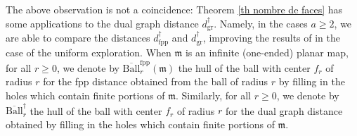 \documentclass[11pt]{article}
\numberwithin{equation}{section}
\begin{document}
{The above observation is not a coincidence:} Theorem \ref{th nombre de faces} has some applications to the dual graph distance $d^\dagger_{\mathrm{gr}}$. Namely, in the cases $a \ge 2$, {we are able to} compare the distances $d^\dagger_{\mathrm{fpp}}$ and $d^\dagger_{\mathrm{gr}}$, improving the results of \cite{CM20} in the case of the uniform exploration. When $\mathfrak{m}$ is an infinite (one-ended) planar map, for all $r \ge 0$, we denote by $\overline{\mathrm{Ball}}^{\mathrm{fpp}}_r(\mathfrak{m})$ the hull of the ball with center $f_r$ of radius $r$ for the fpp distance obtained from the ball of radius $r$ by filling in the holes which contain finite portions of $\mathfrak{m}$. Similarly, for all $r \ge 0$, we denote by $\overline{\mathrm{Ball}}^\dagger_r$ the hull of the ball with center $f_r$ of radius $r$ for the dual graph distance obtained by filling in the holes which contain finite portions of $\mathfrak{m}$.
\end{document}
